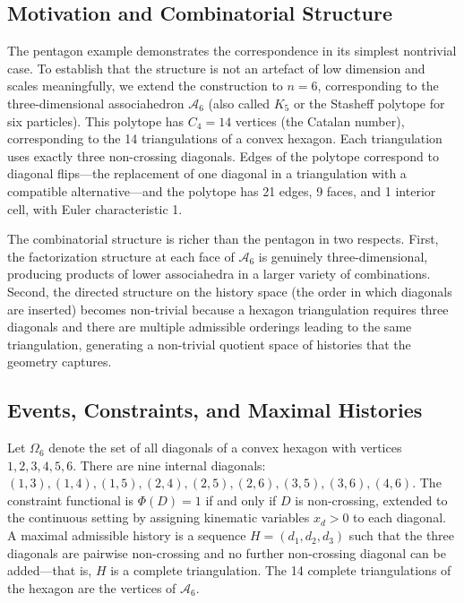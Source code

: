 \documentclass[12pt, oneside]{amsart}
\theoremstyle{plain}
\theoremstyle{definition}
\theoremstyle{remark}
\newcommand{\Phif}{\Phi}
\newcommand{\OmKS}{\Omega}
\begin{document}
\subsection{Motivation and Combinatorial Structure}

The pentagon example demonstrates the correspondence in its simplest nontrivial case. To establish that the structure is not an artefact of low dimension and scales meaningfully, we extend the construction to $n = 6$, corresponding to the three-dimensional associahedron $\mathcal{A}_6$ (also called $K_5$ or the Stasheff polytope for six particles). This polytope has $C_4 = 14$ vertices (the Catalan number), corresponding to the 14 triangulations of a convex hexagon. Each triangulation uses exactly three non-crossing diagonals. Edges of the polytope correspond to diagonal flips---the replacement of one diagonal in a triangulation with a compatible alternative---and the polytope has 21 edges, 9 faces, and 1 interior cell, with Euler characteristic 1.

The combinatorial structure is richer than the pentagon in two respects. First, the factorization structure at each face of $\mathcal{A}_6$ is genuinely three-dimensional, producing products of lower associahedra in a larger variety of combinations. Second, the directed structure on the history space (the order in which diagonals are inserted) becomes non-trivial because a hexagon triangulation requires three diagonals and there are multiple admissible orderings leading to the same triangulation, generating a non-trivial quotient space of histories that the geometry captures.

\subsection{Events, Constraints, and Maximal Histories}

Let $\OmKS_6$ denote the set of all diagonals of a convex hexagon with vertices $1, 2, 3, 4, 5, 6$. There are nine internal diagonals: $(1,3), (1,4), (1,5), (2,4), (2,5), (2,6), (3,5), (3,6), (4,6)$. The constraint functional is $\Phif(D) = 1$ if and only if $D$ is non-crossing, extended to the continuous setting by assigning kinematic variables $x_d > 0$ to each diagonal. A maximal admissible history is a sequence $H = (d_1, d_2, d_3)$ such that the three diagonals are pairwise non-crossing and no further non-crossing diagonal can be added---that is, $H$ is a complete triangulation. The 14 complete triangulations of the hexagon are the vertices of $\mathcal{A}_6$.
\end{document}
